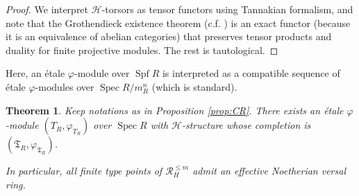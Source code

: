 \documentclass[11pt]{amsart}
\newtheorem{thm}{Theorem}
\numberwithin{thm}{section}
\numberwithin{lem}{section}
\numberwithin{cor}{section}
\numberwithin{prop}{section}
\numberwithin{exam}{section}
\numberwithin{dfn}{section}
\newcommand{\spf}{\operatorname{Spf}}
\newcommand{\spec}{\operatorname{Spec}}
\newcommand{\fT}{\mathfrak{T}}
\newcommand{\clR}{\mathcal{R}}
\newcommand{\clH}{\mathcal{H}}
\begin{document}
\begin{proof}
We interpret $\clH$-torsors
as tensor functors
using Tannakian formalism,
and note that
the Grothendieck existence theorem
(c.f. \cite[Tag 0CYW]{Stacks})
is an exact functor
(because it is an equivalence of abelian categories)
that preserves tensor products
and duality
for finite projective modules.
The rest is tautological.
\end{proof}

Here, an \'etale $\varphi$-module over $\spf R$
is interpreted
as a compatible sequence
of \'etale $\varphi$-modules
over $\spec R/m_R^n$
(which is standard).


\begin{thm}
Keep notations as in Proposition \ref{prop:CR}.
There exists
an \'etale $\varphi$-module
$(T_R, \varphi_{T_R})$
over $\spec R$
with $\clH$-structure
whose completion is
$(\fT_R, \varphi_{\fT_R})$.

In particular,
all finite type points
of $\clR^{\le m}_{H}$
admit an effective Noetherian versal ring.
\label{thm:effective}
\end{thm}
\end{document}
